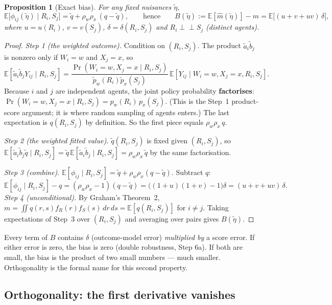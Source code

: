 \documentclass[11pt,a4paper]{article}
\newtheorem{proposition}{Proposition}
\theoremstyle{remark}
\newcommand{\E}{\mathbb{E}}
\newcommand{\1}{\mathbf{1}}
\newcommand{\ind}{\perp\!\!\!\perp}
\begin{document}
\begin{proposition}[Exact bias]\label{prop:bias}
For any fixed nuisances $\tilde\eta$,
\[
\E\big[\phi_{ij}(\tilde\eta)\mid R_i,S_j\big]=\tilde q+\rho_w\rho_x\,(q-\tilde q),
\qquad\text{hence}\qquad
B(\tilde\eta):=\E[\hat m(\tilde\eta)]-m=\E\big[(u+v+uv)\,\delta\big],
\]
where $u=u(R_i)$, $v=v(S_j)$, $\delta=\delta(R_i,S_j)$ and $R_i\ind S_j$ (distinct agents).
\end{proposition}

\begin{proof}
\emph{Step 1 (the weighted outcome).} Condition on $(R_i,S_j)$. The product $\tilde a_i\tilde b_j$ is nonzero only if $W_i=w$ and $X_j=x$, so
\[
\E[\tilde a_i\tilde b_j Y_{ij}\mid R_i,S_j]
=\frac{\Pr(W_i=w,X_j=x\mid R_i,S_j)}{\tilde p_w(R_i)\tilde p_x(S_j)}\,
\E[Y_{ij}\mid W_i=w,X_j=x,R_i,S_j].
\]
Because $i$ and $j$ are independent agents, the joint policy probability \textbf{factorises}:
$\Pr(W_i=w,X_j=x\mid R_i,S_j)=p_w(R_i)\,p_x(S_j)$. (This is the Step~1 product-score argument; it is where random sampling of agents enters.) The last expectation is $q(R_i,S_j)$ by definition. So the first piece equals $\rho_w\rho_x\,q$.

\emph{Step 2 (the weighted fitted value).} $\tilde q(R_i,S_j)$ is fixed given $(R_i,S_j)$, so $\E[\tilde a_i\tilde b_j\tilde q\mid R_i,S_j]=\tilde q\,\E[\tilde a_i\tilde b_j\mid R_i,S_j]=\rho_w\rho_x\,\tilde q$ by the same factorisation.

\emph{Step 3 (combine).} $\E[\phi_{ij}\mid R_i,S_j]=\tilde q+\rho_w\rho_x(q-\tilde q)$. Subtract $q$:
\[
\E[\phi_{ij}\mid R_i,S_j]-q=(\rho_w\rho_x-1)(q-\tilde q)=\big((1+u)(1+v)-1\big)\delta=(u+v+uv)\,\delta .
\]
\emph{Step 4 (unconditional).} By Graham's Theorem~2, $m=\iint q(r,s)f_R(r)f_S(s)\,dr\,ds=\E[q(R_i,S_j)]$ for $i\neq j$. Taking expectations of Step~3 over $(R_i,S_j)$ and averaging over pairs gives $B(\tilde\eta)$.
\end{proof}

\begin{intuitionbox}
Every term of $B$ contains $\delta$ (outcome-model error) \emph{multiplied by} a score error. If either error is zero, the bias is zero (double robustness, Step 6a). If both are small, the bias is the product of two small numbers --- much smaller. Orthogonality is the formal name for this second property.
\end{intuitionbox}

\subsection{Orthogonality: the first derivative vanishes}
\end{document}
